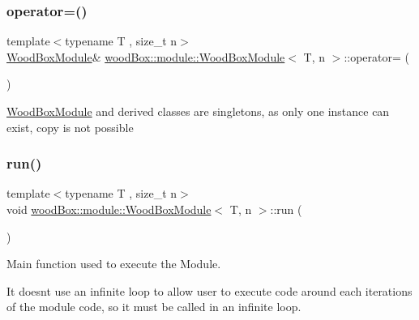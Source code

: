 \subsubsection{\texorpdfstring{operator=()}{operator=()}}
{\footnotesize\ttfamily template$<$typename T , size\+\_\+t n$>$ \\
\mbox{\hyperlink{classwood_box_1_1module_1_1_wood_box_module}{Wood\+Box\+Module}}\& \mbox{\hyperlink{classwood_box_1_1module_1_1_wood_box_module}{wood\+Box\+::module\+::\+Wood\+Box\+Module}}$<$ T, n $>$\+::operator= (\begin{DoxyParamCaption}\item[{const \mbox{\hyperlink{classwood_box_1_1module_1_1_wood_box_module}{Wood\+Box\+Module}}$<$ T, n $>$ \&}]{ }\end{DoxyParamCaption})\hspace{0.3cm}{\ttfamily [delete]}}

\mbox{\hyperlink{classwood_box_1_1module_1_1_wood_box_module}{Wood\+Box\+Module}} and derived classes are singletons, as only one instance can exist, copy is not possible \mbox{\label{classwood_box_1_1module_1_1_wood_box_module_ac65e58ab2338b1e3f57e4ce5d9e70c6c}} 
\subsubsection{\texorpdfstring{run()}{run()}}
{\footnotesize\ttfamily template$<$typename T , size\+\_\+t n$>$ \\
void \mbox{\hyperlink{classwood_box_1_1module_1_1_wood_box_module}{wood\+Box\+::module\+::\+Wood\+Box\+Module}}$<$ T, n $>$\+::run (\begin{DoxyParamCaption}{ }\end{DoxyParamCaption})\hspace{0.3cm}{\ttfamily [inline]}}

Main function used to execute the Module.

It doesn\textquotesingle{}t use an infinite loop to allow user to execute code around each iterations of the module code, so it must be called in an infinite loop. \mbox{\label{classwood_box_1_1module_1_1_wood_box_module_ad40df0835ac2ffcec83cfb96d12f9079}} 
